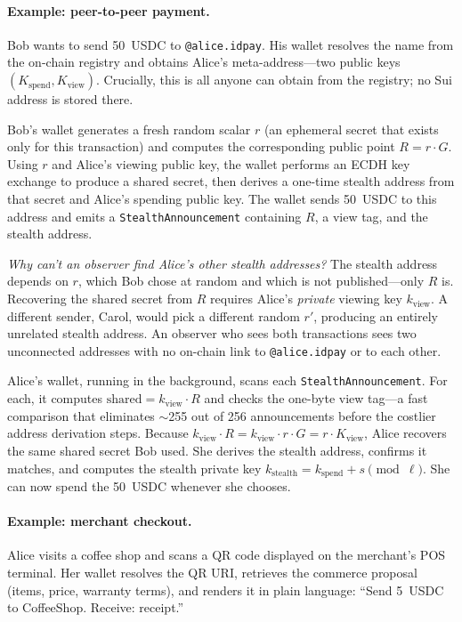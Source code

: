 \documentclass[11pt]{article}
\begin{document}
\paragraph{Example: peer-to-peer payment.}
Bob wants to send 50~USDC to \texttt{@alice.idpay}. His wallet resolves the name from the on-chain registry and obtains Alice's meta-address---two public keys $(K_{\mathrm{spend}}, K_{\mathrm{view}})$. Crucially, this is all anyone can obtain from the registry; no Sui address is stored there.

Bob's wallet generates a fresh random scalar $r$ (an ephemeral secret that exists only for this transaction) and computes the corresponding public point $R = r \cdot G$. Using $r$ and Alice's viewing public key, the wallet performs an ECDH key exchange to produce a shared secret, then derives a one-time stealth address from that secret and Alice's spending public key. The wallet sends 50~USDC to this address and emits a \texttt{StealthAnnouncement} containing $R$, a view tag, and the stealth address.

\emph{Why can't an observer find Alice's other stealth addresses?} The stealth address depends on $r$, which Bob chose at random and which is not published---only $R$ is. Recovering the shared secret from $R$ requires Alice's \emph{private} viewing key $k_{\mathrm{view}}$. A different sender, Carol, would pick a different random $r'$, producing an entirely unrelated stealth address. An observer who sees both transactions sees two unconnected addresses with no on-chain link to \texttt{@alice.idpay} or to each other.

Alice's wallet, running in the background, scans each \texttt{StealthAnnouncement}. For each, it computes $\mathrm{shared} = k_{\mathrm{view}} \cdot R$ and checks the one-byte view tag---a fast comparison that eliminates $\sim$255 out of 256 announcements before the costlier address derivation steps. Because $k_{\mathrm{view}} \cdot R = k_{\mathrm{view}} \cdot r \cdot G = r \cdot K_{\mathrm{view}}$, Alice recovers the same shared secret Bob used. She derives the stealth address, confirms it matches, and computes the stealth private key $k_{\mathrm{stealth}} = k_{\mathrm{spend}} + s \pmod{\ell}$. She can now spend the 50~USDC whenever she chooses.

\paragraph{Example: merchant checkout.}
Alice visits a coffee shop and scans a QR code displayed on the merchant's POS terminal. Her wallet resolves the QR URI, retrieves the commerce proposal (items, price, warranty terms), and renders it in plain language: ``Send 5~USDC to CoffeeShop. Receive: receipt.''
\end{document}
